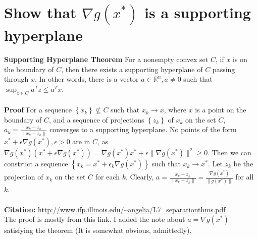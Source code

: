 \documentclass[a4paper,13pt]{article}
\begin{document}
\section{Show that $\nabla g(x^*)$ is a supporting hyperplane}

\textbf{Supporting Hyperplane Theorem} For a nonempty convex set $C$, if $x$ is on the boundary of $C$, then there exists a supporting hyperplane of $C$ passing through $x$. In other words, there is a vector $a \in \mathbb{R}^n, a \neq 0$ such that $\sup_{z \in C} a^T z \leq a^T x$.
\\\\
\textbf{Proof} For a sequence $\left\{ x_k \right\} \not\subseteq C$ such that $x_k \rightarrow x$, where $x$ is a point on the boundary of $C$, and a sequence of projections $\left\{ z_k \right\}$ of $x_k$ on the set $C$, $a_k = \frac{x_k - z_k}{\lVert x_k - z_k \rVert}$ converges to a supporting hyperplane. No points of the form $x^* + \epsilon \nabla g(x^*), \epsilon > 0$ are in $C$, as $\nabla g(x^*) (x^* + \epsilon \nabla g(x^*)) = \nabla g(x^*) x^* + \epsilon \lVert \nabla g(x^*) \rVert^2 \geq 0$. Then we can construct a sequence $\left\{ x_k = x^* + \epsilon_k \nabla g(x^*) \right\}$ such that $x_k \rightarrow x^*$. Let $z_k$ be the projection of $x_k$ on the set $C$ for each $k$. Clearly, $a = \frac{x_k - z_k}{\lVert x_k - z_k \rVert} = \frac{\nabla g(x^*)}{\lVert g(x^*) \rVert}$ for all $k$. 
\\\\
\textbf{Citation:} \url{http://www.ifp.illinois.edu/~angelia/L7_separationthms.pdf} \\
The proof is mostly from this link. I added the note about $a = \nabla g(x^*)$ satisfying the theorem (It is somewhat obvious, admittedly).
\end{document}
